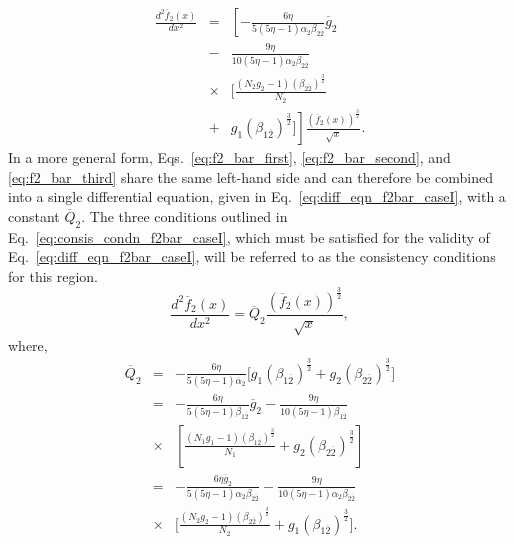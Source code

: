 \documentclass[final,3p,times,twocolumn]{elsarticle}
\begin{document}
            \begin{eqnarray}
                  \frac{d^2 \overline{f}_{2}(x)}{dx^2} &=& \left[-\frac{6\eta}{5(5\eta-1) \alpha_2 \beta_{2\overline{2}}}    \overline{g}_{2} \right. \nonumber \\
                  &-& \frac{9\eta}{10(5\eta-1) \alpha_2 \beta_{2\overline{2}}} \nonumber \\
                  &\times& \biggl[\frac{(N_2 g_2-1)(\beta_{2\overline{2}})^\frac{3}{2}}{N_2} \nonumber \\ 
                  &+& \left. g_1 (\beta_{1\overline{2}})^\frac{3}{2}\biggr]\right]
                  \frac{\left( \overline{f}_{2}(x) \right)^\frac{3}{2}}{\sqrt{x}}.
                \label{eq:f2_bar_third}
            \end{eqnarray}
            In a more general form, Eqs.~\eqref{eq:f2_bar_first}, \eqref{eq:f2_bar_second}, and \eqref{eq:f2_bar_third} share the same left-hand side and can therefore be combined into a single differential equation, given in Eq.~\eqref{eq:diff_eqn_f2bar_caseI}, with a constant $\overline{Q}_{2}$. The three conditions outlined in Eq.~\eqref{eq:consis_condn_f2bar_caseI}, which must be satisfied for the validity of Eq.~\eqref{eq:diff_eqn_f2bar_caseI}, will be referred to as the consistency conditions for this region.
            \begin{equation}
                   \frac{d^2\overline{f}_{2}(x)}{dx^2} = \overline{Q}_{2} \frac{\left(\overline{f}_{2}(x)\right)^\frac{3}{2}}{\sqrt{x}},
                    \label{eq:diff_eqn_f2bar_caseI}
            \end{equation}
            where,  
            \begin{eqnarray}
                \overline{Q}_{2} &=& 
                    -\frac{6\eta}{5(5\eta-1) \overline{\alpha}_2} \biggl[ g_1 (\beta_{1\overline{2}})^\frac{3}{2} + g_2 (\beta_{2\overline{2}})^\frac{3}{2}
                    \biggr] \nonumber \\
                    &=& - \frac{6 \eta}{5 (5 \eta -1) \beta_{1\overline{2}}}\overline{g}_{2} -\frac{9\eta}{10(5\eta-1)\beta_{1\overline{2}}} \nonumber \\ 
                    &\times& \left[\frac{(N_1 g_1-1)(\beta_{1\overline{2}})^\frac{3}{2}}{N_1} + g_2 (\beta_{2\overline{2}})^\frac{3}{2} \right] \nonumber \\
                   &=& -\frac{6\eta \overline{g}_{2}}{5(5\eta-1) \alpha_2 \beta_{2\overline{2}}} - \frac{9\eta}{10(5\eta-1) \alpha_2 \beta_{2\overline{2}}} \nonumber \\
                   &\times& \biggl[\frac{(N_2 g_2-1)(\beta_{2\overline{2}})^\frac{3}{2}}{N_2} + g_1 (\beta_{1\overline{2}})^\frac{3}{2}\biggr].
                \label{eq:consis_condn_f2bar_caseI}
            \end{eqnarray}
            
\end{document}
